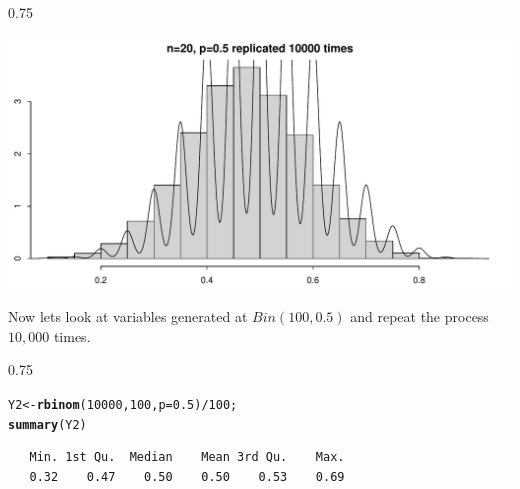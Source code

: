 \documentclass{beamer}\usepackage[]{graphicx}\usepackage[]{color}
\makeatletter
\newcommand{\hlnum}[1]{\textcolor[rgb]{0.2,0.2,0.2}{#1}}%
\newcommand{\hlopt}[1]{\textcolor[rgb]{0.102,0.102,0.102}{#1}}%
\newcommand{\hlstd}[1]{\textcolor[rgb]{0.102,0.102,0.102}{#1}}%
\newcommand{\hlkwb}[1]{\textcolor[rgb]{0.102,0.102,0.102}{#1}}%
\newcommand{\hlkwc}[1]{\textcolor[rgb]{0.2,0.2,0.2}{#1}}%
\newcommand{\hlkwd}[1]{\textcolor[rgb]{0.102,0.102,0.102}{\textbf{#1}}}%
\newenvironment{kframe}{%
 \def\at@end@of@kframe{}%
 \ifinner\ifhmode%
  \def\at@end@of@kframe{\end{minipage}}%
  \begin{minipage}{\columnwidth}%
 \fi\fi%
 \def\FrameCommand##1{\hskip\@totalleftmargin \hskip-\fboxsep
 \colorbox{shadecolor}{##1}\hskip-\fboxsep
     \hskip-\linewidth \hskip-\@totalleftmargin \hskip\columnwidth}%
 \MakeFramed {\advance\hsize-\width
   \@totalleftmargin\z@ \linewidth\hsize
   \@setminipage}}%
 {\par\unskip\endMakeFramed%
 \at@end@of@kframe}
\newenvironment{knitrout}{}{} %
\renewenvironment{knitrout}{\begin{spacing}{0.75}\begin{tiny}}{\end{tiny}\end{spacing}}
\makeatother
\begin{document}
\begin{frame}[fragile]

\begin{knitrout}\small
{}\color{fgcolor}

{\centering \includegraphics[width=0.89\linewidth]{figure/graphics-unnamed-chunk-15-1} 

}



\end{knitrout}

\end{frame}

\begin{frame}[fragile]

Now lets look at variables generated at $Bin(100,0.5)$ and repeat the process $10,000$ times.

\begin{knitrout}\small
{}\color{fgcolor}\begin{kframe}
\begin{alltt}
\hlstd{Y2} \hlkwb{<-} \hlkwd{rbinom}\hlstd{(}\hlnum{10000}\hlstd{,} \hlnum{100}\hlstd{,} \hlkwc{p}\hlstd{=}\hlnum{0.5}\hlstd{)}\hlopt{/} \hlnum{100}\hlstd{;}
\hlkwd{summary}\hlstd{(Y2)}
\end{alltt}
\begin{verbatim}
   Min. 1st Qu.  Median    Mean 3rd Qu.    Max. 
   0.32    0.47    0.50    0.50    0.53    0.69 
\end{verbatim}
\end{kframe}
\end{knitrout}

\end{frame}
\end{document}
